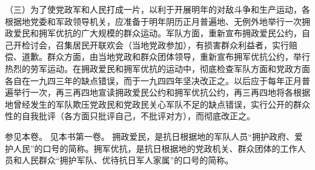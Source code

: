 （三）为了使党政军和人民打成一片，以利于开展明年的对敌斗争和生产运动，各根据地党委和军政领导机关，应准备于明年阴历正月普遍地、无例外地举行一次拥政爱民和拥军优抗的广大规模的群众运动。军队方面，重新宣布拥政爱民公约，自己开检讨会，召集居民开联欢会（当地党政参加），有损害群众利益者，实行赔偿、道歉。群众方面，由当地党政和群众团体领导，重新宣布拥军优抗公约，举行热烈的劳军运动。在拥政爱民和拥军优抗的运动中，彻底检查军队方面和党政方面各自在一九四三年的缺点错误，而于一九四四年坚决改正之。以后应于每年正月普遍举行一次，再三再四地宣读拥政爱民公约和拥军优抗公约，再三再四地将各根据地曾经发生的军队欺压党政民和党政民关心军队不足的缺点错误，实行公开的群众性的自我批评（各方面只批评自己，不批评对方），而彻底改正之。


\begin{maonote}
参见本卷。
见本书第一卷。
拥政爱民，是抗日根据地的军队人员“拥护政府、爱护人民”的口号的简称。拥军优抗，是抗日根据地的党政机关、群众团体的工作人员和人民群众“拥护军队、优待抗日军人家属”的口号的简称。
\end{maonote}
